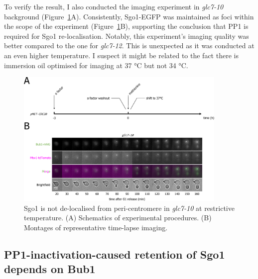 To verify the result, I also conducted the imaging experiment in \textit{glc7-10} background (Figure~\ref{fig:sgo1glc710}A). Consistently, Sgo1-EGFP was maintained as foci within the scope of the experiment (Figure~\ref{fig:sgo1glc710}B), supporting the conclusion that PP1 is required for Sgo1 re-localisation. Notably, this experiment's imaging quality was better compared to the one for \textit{glc7-12}. This is unexpected as it was conducted at an even higher temperature. I suspect it might be related to the fact there is immersion oil optimised for imaging at 37 \si{\celsius} but not 34 \si{\celsius}. 

\begin{figure}[htbp]
  \centering
  \includegraphics[width=0.9\textwidth]{chapter3/figures/Sgo1 glc7-10.pdf}
  \caption[Sgo1 is not de-localised from peri-centromere in \textit{glc7-10} at restrictive temperature]{Sgo1 is not de-localised from peri-centromere in \textit{glc7-10} at restrictive temperature. (A) Schematics of experimental procedures. (B) Montages of representative time-lapse imaging.}
  \label{fig:sgo1glc710}
\end{figure}

\subsection{PP1-inactivation-caused retention of Sgo1 depends on Bub1}

